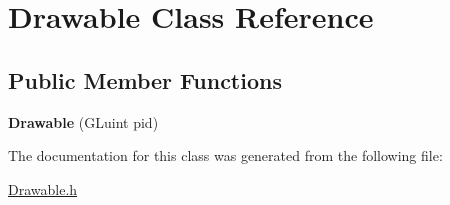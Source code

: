 \hypertarget{class_drawable}{}\section{Drawable Class Reference}
\label{class_drawable}
\subsection*{Public Member Functions}
\begin{DoxyCompactItemize}
\item 
\hypertarget{class_drawable_ac312db8dc2c3afba553747e92ee7c5e4}{}{\bfseries Drawable} (G\+Luint pid)\label{class_drawable_ac312db8dc2c3afba553747e92ee7c5e4}

\end{DoxyCompactItemize}


The documentation for this class was generated from the following file\+:\begin{DoxyCompactItemize}
\item 
\hyperlink{_drawable_8h}{Drawable.\+h}\end{DoxyCompactItemize}

